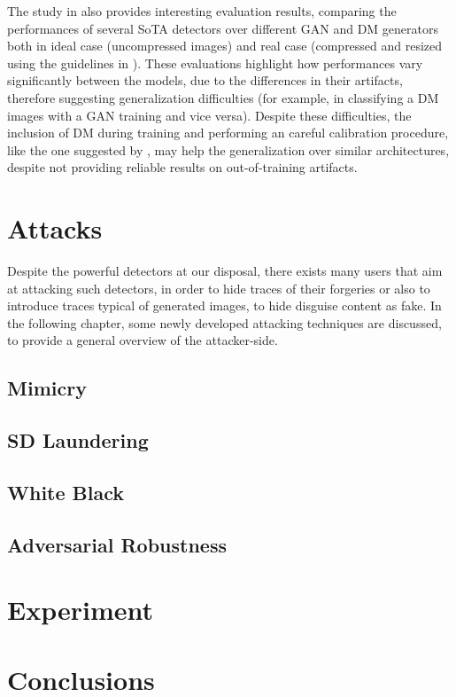 \documentclass[conference]{IEEEtran} %
\begin{document}
        The study in \cite{corvi2023detection} also provides interesting evaluation results, comparing the performances of several SoTA detectors over different GAN and DM generators both in ideal case (uncompressed images) and real case (compressed and resized using the guidelines in \cite{vipcuplink}). These evaluations highlight how performances vary significantly between the models, due to the differences in their artifacts, therefore suggesting generalization difficulties (for example, in classifying a DM images with a GAN training and vice versa). Despite these difficulties, the inclusion of DM during training and performing an careful calibration procedure, like the one suggested by \cite{Platt1999probabilistic}, may help the generalization over similar architectures, despite not providing reliable results on out-of-training artifacts.
\section{Attacks}
    Despite the powerful detectors at our disposal, there exists many users that aim at attacking such detectors, in order to hide traces of their forgeries or also to introduce traces typical of generated images, to hide disguise content as fake. In the following chapter, some newly developed attacking techniques are discussed, to provide a general overview of the attacker-side.
    \subsection{Mimicry}
    \subsection{SD Laundering}
    \subsection{White Black}
    \subsection{Adversarial Robustness}
\section{Experiment}
\section{Conclusions}

\end{document}
